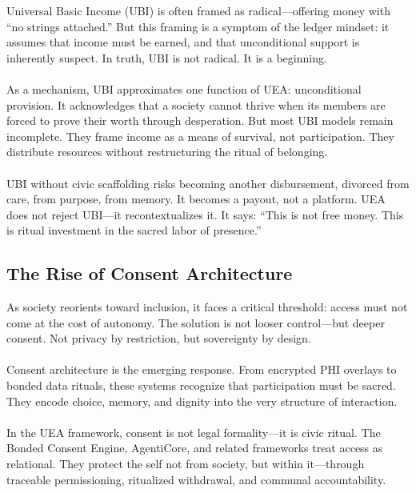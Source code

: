 \documentclass[12pt]{article}
\begin{document}
Universal Basic Income (UBI) is often framed as radical—offering money with ``no strings attached.'' But this framing is a symptom of the ledger mindset: it assumes that income must be earned, and that unconditional support is inherently suspect. In truth, UBI is not radical. It is a beginning.

\paragraph{}As a mechanism, UBI approximates one function of UEA: unconditional provision. It acknowledges that a society cannot thrive when its members are forced to prove their worth through desperation. But most UBI models remain incomplete. They frame income as a means of survival, not participation. They distribute resources without restructuring the ritual of belonging.

\paragraph{}UBI without civic scaffolding risks becoming another disbursement, divorced from care, from purpose, from memory. It becomes a payout, not a platform. UEA does not reject UBI—it recontextualizes it. It says: ``This is not free money. This is ritual investment in the sacred labor of presence.'' \cite{standing2017basicincome,sen1999development}

\subsection{The Rise of Consent Architecture}

As society reorients toward inclusion, it faces a critical threshold: access must not come at the cost of autonomy. The solution is not looser control—but deeper consent. Not privacy by restriction, but sovereignty by design.

\paragraph{}Consent architecture is the emerging response. From encrypted PHI overlays to bonded data rituals, these systems recognize that participation must be sacred. They encode choice, memory, and dignity into the very structure of interaction.

\paragraph{}In the UEA framework, consent is not legal formality—it is civic ritual. The Bonded Consent Engine, AgentiCore, and related frameworks treat access as relational. They protect the self not from society, but within it—through traceable permissioning, ritualized withdrawal, and communal accountability. \cite{spade2015normal,fraser2003justice}
\end{document}
